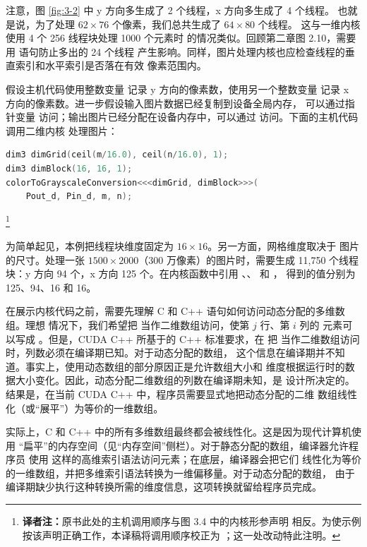 注意，图 \ref{fig:3-2} 中 y 方向多生成了 2 个线程，x 方向多生成了 4 个线程。
也就是说，为了处理 $62\times76$ 个像素，我们总共生成了 $64\times80$ 个线程。
这与一维内核  使用 4 个 256 线程块处理 1000 个元素时
的情况类似。回顾第二章图 2.10，需要用  语句防止多出的 24 个线程
产生影响。同样，图片处理内核也应检查线程的垂直索引和水平索引是否落在有效
像素范围内。

假设主机代码使用整数变量  记录 y 方向的像素数，使用另一个整数变量
 记录 x 方向的像素数。进一步假设输入图片数据已经复制到设备全局内存，
可以通过指针变量  访问；输出图片已经分配在设备内存中，可以通过
 访问。下面的主机代码调用二维内核 
处理图片：

\begin{lstlisting}[language=C++]
dim3 dimGrid(ceil(m/16.0), ceil(n/16.0), 1);
dim3 dimBlock(16, 16, 1);
colorToGrayscaleConversion<<<dimGrid, dimBlock>>>(
    Pout_d, Pin_d, m, n);
\end{lstlisting}

\footnote{\noindent\textbf{译者注：}原书此处的主机调用顺序与图 3.4 中的内核形参声明
 相反。为使示例按该声明正确工作，本译稿将调用顺序校正为
；这一处改动特此注明。}

为简单起见，本例把线程块维度固定为 $16\times16$。另一方面，网格维度取决于
图片的尺寸。处理一张 $1500\times2000$（300 万像素）的图片时，需要生成
11,750 个线程块：y 方向 94 个，x 方向 125 个。在内核函数中引用
、、 和 ，
得到的值分别为 125、94、16 和 16。

在展示内核代码之前，需要先理解 C 和 C++ 语句如何访问动态分配的多维数组。理想
情况下，我们希望把  当作二维数组访问，使第 $j$ 行、第 $i$ 列的
元素可以写成 。但是，CUDA C++ 所基于的 C++ 标准要求，在
把  当作二维数组访问时，列数必须在编译期已知。对于动态分配的数组，
这个信息在编译期并不知道。事实上，使用动态数组的部分原因正是允许数组大小和
维度根据运行时的数据大小变化。因此，动态分配二维数组的列数在编译期未知，是
设计所决定的。结果是，在当前 CUDA C++ 中，程序员需要显式地把动态分配的二维
数组线性化（或“展平”）为等价的一维数组。

实际上，C 和 C++ 中的所有多维数组最终都会被线性化。这是因为现代计算机使用
“扁平”的内存空间（见“内存空间”侧栏）。对于静态分配的数组，编译器允许程序员
使用  这样的高维索引语法访问元素；在底层，编译器会把它们
线性化为等价的一维数组，并把多维索引语法转换为一维偏移量。对于动态分配的数组，
由于编译期缺少执行这种转换所需的维度信息，这项转换就留给程序员完成。

